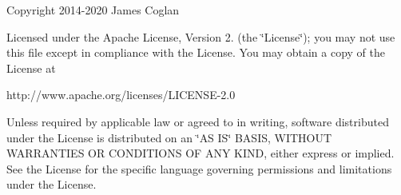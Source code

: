 Copyright 2014-\/2020 James Coglan

Licensed under the Apache License, Version 2. (the \char`\"{}\+License\char`\"{}); you may not use this file except in compliance with the License. You may obtain a copy of the License at \begin{DoxyVerb}http://www.apache.org/licenses/LICENSE-2.0
\end{DoxyVerb}
 Unless required by applicable law or agreed to in writing, software distributed under the License is distributed on an \char`\"{}\+AS IS\char`\"{} BASIS, WITHOUT WARRANTIES OR CONDITIONS OF ANY KIND, either express or implied. See the License for the specific language governing permissions and limitations under the License. 